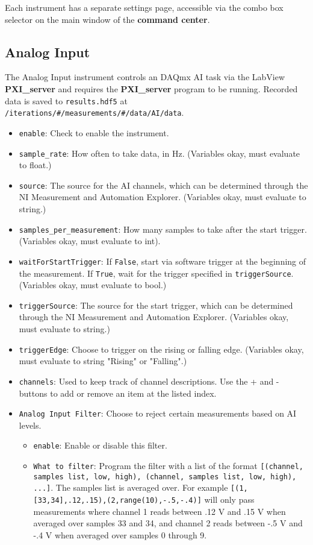 \documentclass[pdftex,11pt,letterpaper]{article}
\begin{document}
Each instrument has a separate settings page, accessible via the combo box selector on the main window of the \textbf{command center}.

\subsection{Analog Input}

The Analog Input instrument controls an DAQmx AI task via the LabView \textbf{PXI\_server} and requires the \textbf{PXI\_server} program to be running.  Recorded data is saved to \texttt{results.hdf5} at \texttt{/iterations/\#/measurements/\#/data/AI/data}.

\begin{itemize}
\item \texttt{enable}: Check to enable the instrument.
\item \texttt{sample\_rate}:  How often to take data, in Hz.  (Variables okay, must evaluate to float.)
\item \texttt{source}:  The source for the AI channels, which can be determined through the NI Measurement and Automation Explorer.  (Variables okay, must evaluate to string.)
\item \texttt{samples\_per\_measurement}:  How many samples to take after the start trigger.  (Variables okay, must evaluate to int).
\item \texttt{waitForStartTrigger}:  If \texttt{False}, start via software trigger at the beginning of the measurement.  If \texttt{True}, wait for the trigger specified in \texttt{triggerSource}.  (Variables okay, must evaluate to bool.)
\item \texttt{triggerSource}:  The source for the start trigger, which can be determined through the NI Measurement and Automation Explorer.  (Variables okay, must evaluate to string.)
\item \texttt{triggerEdge}:  Choose to trigger on the rising or falling edge.  (Variables okay, must evaluate to string "Rising" or "Falling".)
\item \texttt{channels}:  Used to keep track of channel descriptions.  Use the + and - buttons to add or remove an item at the listed index.
\item \texttt{Analog Input Filter}:  Choose to reject certain measurements based on AI levels.
\begin{itemize}
\item \texttt{enable}: Enable or disable this filter.
\item \texttt{What to filter}: Program the filter with a list of the format \texttt{[(channel, samples list, low, high), (channel, samples list, low, high), ...]}.  The samples list is averaged over.  For example \texttt{[(1,[33,34],.12,.15),(2,range(10),-.5,-.4)]} will only pass measurements where channel 1 reads between .12 V and .15 V when averaged over samples 33 and 34, and channel 2 reads between -.5 V and -.4 V when averaged over samples 0 through 9.

\end{itemize}
\end{itemize}
\end{document}
